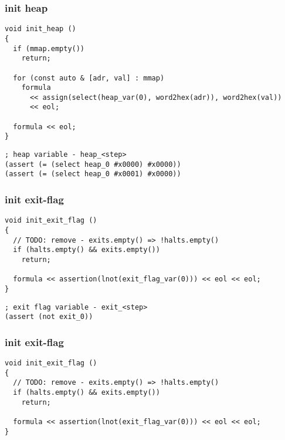 \subsubsection{init heap}

\begin{lstlisting}[style=c++]
void init_heap ()
{
  if (mmap.empty())
    return;

  for (const auto & [adr, val] : mmap)
    formula
      << assign(select(heap_var(0), word2hex(adr)), word2hex(val))
      << eol;

  formula << eol;
}
\end{lstlisting}

\begin{lstlisting}[language=SMTLib]
; heap variable - heap_<step>
(assert (= (select heap_0 #x0000) #x0000))
(assert (= (select heap_0 #x0001) #x0000))
\end{lstlisting}

\subsubsection{init exit-flag}

\begin{lstlisting}[style=c++]
void init_exit_flag ()
{
  // TODO: remove - exits.empty() => !halts.empty()
  if (halts.empty() && exits.empty())
    return;

  formula << assertion(lnot(exit_flag_var(0))) << eol << eol;
}
\end{lstlisting}

\begin{lstlisting}[language=SMTLib]
; exit flag variable - exit_<step>
(assert (not exit_0))
\end{lstlisting}

\subsubsection{init exit-flag}

\begin{lstlisting}[style=c++]
void init_exit_flag ()
{
  // TODO: remove - exits.empty() => !halts.empty()
  if (halts.empty() && exits.empty())
    return;

  formula << assertion(lnot(exit_flag_var(0))) << eol << eol;
}
\end{lstlisting}

